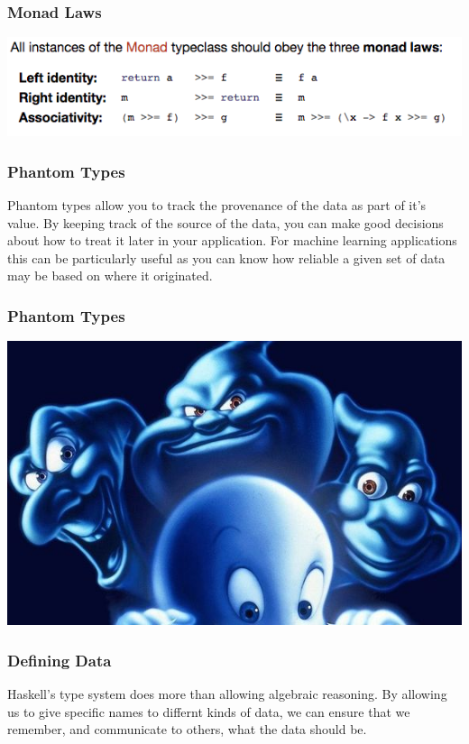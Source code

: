 \documentclass{beamer}
\begin{document}
\begin{frame}[fragile]
  \frametitle{Monad Laws}
    \begin{center}
    \includegraphics[width=.90\paperwidth]{images/monad-laws.png}
  \end{center}
\end{frame}

\begin{frame}
  \frametitle{Phantom Types}
  Phantom types allow you to track the provenance of the data as part
  of it's value.  By keeping track of the source of the data, you can
  make good decisions about how to treat it later in your application.
  For machine learning applications this can be particularly useful as
  you can know how reliable a given set of data may be based on where
  it originated.
\end{frame}

\begin{frame}[fragile]
  \frametitle{Phantom Types}
    \begin{center}
    \includegraphics[width=.85\paperwidth]{images/casper.jpg}
  \end{center}
\end{frame}

\begin{frame}
  \frametitle{Defining Data}
  Haskell's type system does more than allowing algebraic reasoning.
  By allowing us to give specific names to differnt kinds of data, we
  can ensure that we remember, and communicate to others, what the
  data should be.
\end{frame}
\end{document}

